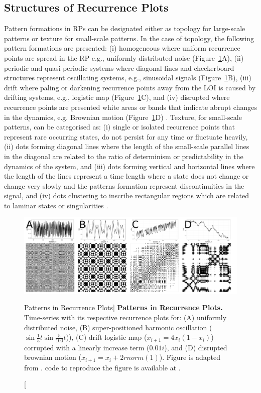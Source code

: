\subsection{Structures of Recurrence Plots}
Pattern formations in RPs can be designated either 
as topology for large-scale patterns or texture for small-scale patterns.
In the case of topology, the following pattern formations are presented:
(i) homogeneous where uniform recurrence points are spread in the RP e.g., 
uniformly distributed noise (Figure~\ref{fig:rp2}A), 
(ii) periodic and quasi-periodic systems where diagonal lines and 
checkerboard structures represent oscillating systems, e.g., sinusoidal 
signals (Figure~\ref{fig:rp2}B), 
(iii) drift where paling or darkening recurrence points away from 
the LOI is caused by drifting systems, 
e.g., logistic map (Figure~\ref{fig:rp2}C), and
(iv) disrupted where recurrence points are presented white areas or 
bands that indicate abrupt changes in the dynamics, e.g. Brownian motion 
(Figure~\ref{fig:rp2}D) \citep{eckmann1987, marwan2015}.
Texture, for small-scale patterns, can be categorised as:
(i) single or isolated recurrence points that represent rare occurring 
states, do not persist for any time or fluctuate heavily,
(ii) dots forming diagonal lines where the length of the small-scale parallel 
lines in the diagonal are related to the ratio of determinism or 
predictability in the dynamics of the system, and
(iii) dots forming vertical and horizontal lines where the length of the 
lines represent a time length where a state does not change or change very 
slowly and the patterns formation represent discontinuities in the signal, and
(iv) dots clustering to inscribe rectangular regions which are related 
to laminar states or singularities \citep{marwan2015}.

\begin{figure}
  \centering
    \includegraphics[width=1.0\textwidth]{fig_3_06}
    \caption
	[Patterns in Recurrence Plots]{
	{\bf Patterns in Recurrence Plots.} 
	Time-series with its respective recurrence plots for:
	(A) uniformly distributed noise,
	(B) super-positioned harmonic oscillation 
	($\sin{ \frac{1}{5} t} \sin{ \frac{5}{100}t) }$),
	(C) drift logistic map ($x_{i+1} = 4 x_i (1- x_i) $) corrupted 
	with a linearly increase term ($0.01 i$), and
	(D) disrupted brownian motion  ($x_{i+1} = x_i + 2rnorm(1) $).
	Figure is adapted from \cite{marwan2015}.
	\R code to reproduce the figure is available at 
	.
	}
    \label{fig:rp2}
\end{figure}

